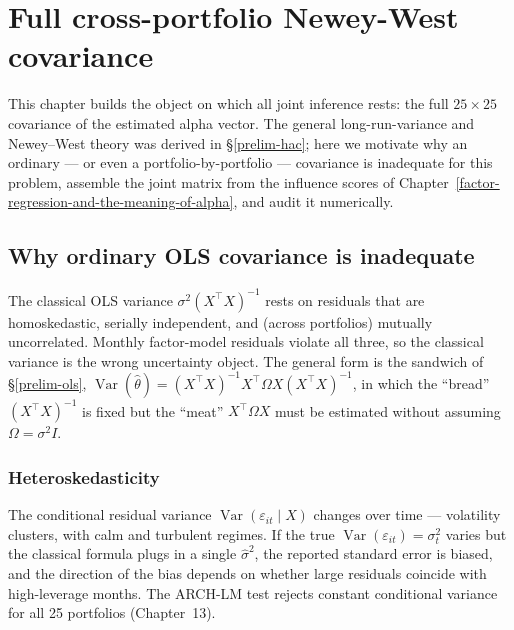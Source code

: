 \hypertarget{hac}{}
\hypertarget{full-cross-portfolio-newey-west-covariance}{%
\chapter{Full cross-portfolio Newey-West
covariance}\label{full-cross-portfolio-newey-west-covariance}}

This chapter builds the object on which all joint inference rests: the
full $25\times25$ covariance of the estimated alpha vector. The general
long-run-variance and Newey--West theory was derived in \S\ref{prelim-hac};
here we motivate why an ordinary --- or even a portfolio-by-portfolio ---
covariance is inadequate for this problem, assemble the joint matrix from
the influence scores of Chapter~\ref{factor-regression-and-the-meaning-of-alpha},
and audit it numerically.

\hypertarget{why-ordinary-ols-covariance-is-inadequate}{%
\section{Why ordinary OLS covariance is
inadequate}\label{why-ordinary-ols-covariance-is-inadequate}}

The classical OLS variance $\sigma^2(X^{\top}X)^{-1}$ rests on residuals
that are homoskedastic, serially independent, and (across portfolios)
mutually uncorrelated. Monthly factor-model residuals violate all three,
so the classical variance is the wrong uncertainty object. The general
form is the sandwich of \S\ref{prelim-ols},
$\operatorname{Var}(\hat\theta)=(X^{\top}X)^{-1}X^{\top}\Omega X(X^{\top}X)^{-1}$,
in which the ``bread'' $(X^{\top}X)^{-1}$ is fixed but the ``meat''
$X^{\top}\Omega X$ must be estimated without assuming $\Omega=\sigma^2 I$.

\hypertarget{heteroskedasticity}{%
\subsection{Heteroskedasticity}\label{heteroskedasticity}}

The conditional residual variance $\operatorname{Var}(\varepsilon_{it}\mid X)$
changes over time --- volatility clusters, with calm and turbulent regimes.
If the true $\operatorname{Var}(\varepsilon_{it})=\sigma_t^2$ varies but the
classical formula plugs in a single $\hat\sigma^2$, the reported standard
error is biased, and the direction of the bias depends on whether large
residuals coincide with high-leverage months. The ARCH-LM test rejects
constant conditional variance for all 25 portfolios (Chapter~13).

